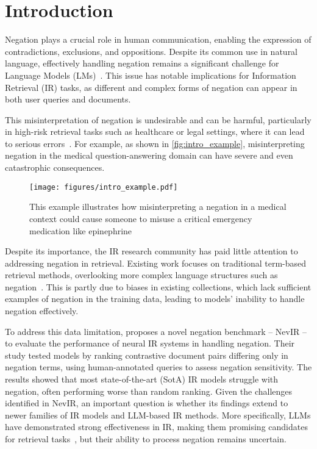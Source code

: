 
\section{Introduction}
Negation plays a crucial role in human communication, enabling the expression of contradictions, exclusions, and oppositions. Despite its common use in natural language, effectively handling negation remains a significant challenge for Language Models (LMs)~\cite{condaqa}. This issue has notable implications for Information Retrieval (IR) tasks, as different and complex forms of negation can appear in both user queries and documents.

This misinterpretation of negation is undesirable and can be harmful, particularly in high-risk retrieval tasks such as healthcare or legal settings, where it can lead to serious errors~\cite{weller2024nevirnegationneuralinformation}. For example, as shown in \autoref{fig:intro_example}, misinterpreting negation in the medical question-answering domain can have severe and even catastrophic consequences.

\begin{figure}
    \centering
    \texttt{[image: figures/intro\_example.pdf]}
    \caption{This example illustrates how misinterpreting a negation in a medical context could cause someone to misuse a critical emergency medication like epinephrine}
    \label{fig:intro_example}
\end{figure}

Despite its importance, the IR research community has paid little attention to addressing negation in retrieval. Existing work focuses on traditional term-based retrieval methods, overlooking more complex language structures such as negation~\cite{averbuch2004context, kim2019statute}. This is partly due to biases in existing collections, which lack sufficient examples of negation in the training data, leading to models' inability to handle negation effectively.

To address this data limitation, \citet{weller2024nevirnegationneuralinformation} proposes a novel negation benchmark -- NevIR -- to evaluate the performance of neural IR systems in handling negation. Their study tested models by ranking contrastive document pairs differing only in negation terms, using human-annotated queries to assess negation sensitivity. The results showed that most state-of-the-art (SotA) IR models struggle with negation, often performing worse than random ranking.
Given the challenges identified in NevIR, an important question is whether its findings extend to newer families of IR models and LLM-based IR methods. More specifically, LLMs have demonstrated strong effectiveness in IR, making them promising candidates for retrieval tasks~\cite{repllama_rankllama, rankGPT, qin2023large, ma2023zeroshotlistwisedocumentreranking}, but their ability to process negation remains uncertain. 

